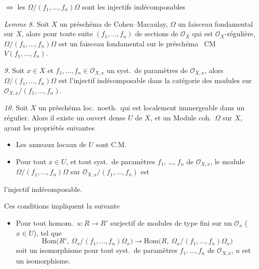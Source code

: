 \documentclass[11pt,a4paper]{article}
\begin{document}
 $\Longleftrightarrow$ les
$\Omega/(f_1, \ldots, f_n)\Omega$ sont \struck{\ill{} \ill{}} les injectifs
indécomposables \ill{}

\emph{Lemme 8.} Soit $X$ un préschéma de Cohen--Macaulay, $\Omega$ un faisceau
fondamental sur $X$, alors pour toute suite $(f_1, \ldots, f_n)$ de sections
de $\mathcal{O}_X$ qui est $\mathcal{O}_X$-régulière,
$\Omega/(f_1, \ldots, f_n)\Omega$ est un faisceau fondamental sur le
préschéma \ CM \struck{\ill{}} $V(f_1, \ldots, f_n)$.

\emph{ 9.} Soit $x \in X$ et $f_1, \ldots, f_n \in
\mathcal{O}_{X,x}$ un syst.\ de paramètres de $\mathcal{O}_{X,x}$, alors
$\Omega/(f_1, \ldots, f_n)\Omega$ est \struck{\ill{}} l'injectif
indécomposable dans la catégorie des modules sur
$\mathcal{O}_{X,x}/(f_1, \ldots, f_n)$.

\emph{ 10.} Soit $X$ un préschéma loc.\ noeth.\ qui est
localement immergeable dans un régulier. Alors il existe un ouvert dense $U$
de $X$, et un Module coh.\ $\Omega$ sur $X$, ayant les propriétés suivantes
\begin{itemize}
  \item[a)] Les anneaux locaux de $U$ sont C.M.
  \item[b)] Pour tout $x \in U$, et tout syst.\ de paramètres
    $f_1$, \ldots, $f_n$ de $\mathcal{O}_{X,x}$, le module
    $\Omega/(f_1, \ldots, f_n)\Omega$ sur
    $\mathcal{O}_{X,x}/(f_1, \ldots, f_n)$ est
\end{itemize}

l'injectif indécomposable.

Ces conditions impliquent la suivante
\begin{itemize}
  \item[c)] Pour tout homom.\ $u \colon R \to R'$ surjectif de modules de type
    fini sur un $\mathcal{O}_x$ ($x \in U$), tel que
    \[
      \mathrm{Hom}\bigl(R',\ \Omega_x/(f_1, \ldots, f_n)\Omega_x\bigr) \to
      \mathrm{Hom}\bigl(R,\ \Omega_x/(f_1, \ldots, f_n)\Omega_x\bigr)
    \]
    soit un isomorphisme pour tout syst.\ de paramètres $f_1, \ldots, f_n$ de
    $\mathcal{O}_{X,x}$,  $u$ est un isomorphisme.
\end{itemize}
\end{document}
